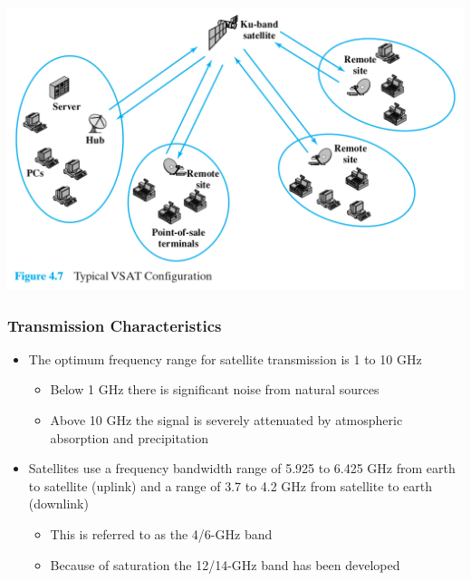 \documentclass[pdflatex,compress]{beamer}
\begin{document}
\begin{frame}
	\begin{center}
		\includegraphics[height=0.9\textheight]{img/img21a}
	\end{center}
\end{frame}

\begin{frame}
	\frametitle{Transmission Characteristics}
	\begin{itemize}
		\item The optimum frequency range for satellite transmission is 1 to 10 GHz
		\begin{itemize}
			\item Below 1 GHz there is significant noise from natural sources
			\item Above 10 GHz the signal is severely attenuated by atmospheric absorption and precipitation
		\end{itemize}
		\item Satellites use a frequency bandwidth range of 5.925 to 6.425 GHz from earth to satellite (uplink) and a range of 3.7 to 4.2 GHz from satellite to earth (downlink)
		\begin{itemize}
			\item This is referred to as the 4/6-GHz band
			\item Because of saturation the 12/14-GHz band has been developed
		\end{itemize}
	\end{itemize}
\end{frame}
\end{document}
